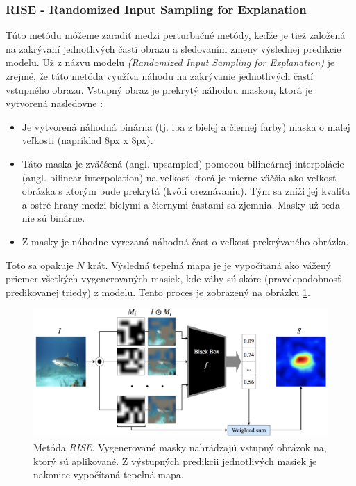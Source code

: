 
\subsubsection{RISE - Randomized Input Sampling for Explanation}

Túto metódu môžeme zaradiť medzi perturbačné metódy, keďže je tiež založená na zakrývaní jednotlivých častí obrazu a sledovaním zmeny výslednej predikcie modelu. Už z názvu modelu \textit{(Randomized Input Sampling for Explanation)} je zrejmé, že táto metóda využíva náhodu na zakrývanie jednotlivých častí vstupného obrazu. Vstupný obraz je prekrytý náhodou maskou, ktorá je vytvorená nasledovne \cite{petsiuk2018rise}:

\begin{itemize}
    \item Je vytvorená náhodná binárna (tj. iba z bielej a čiernej farby) maska o malej veľkosti (napríklad 8px x 8px).
    \item Táto maska je zväčšená (angl. upsampled) pomocou bilineárnej interpolácie \cite{petsiuk2018rise} (angl. bilinear interpolation) na veľkosť ktorá je mierne väčšia ako veľkosť obrázka s ktorým bude prekrytá (kvôli oreznávaniu). Tým sa zníži jej kvalita a ostré hrany medzi bielymi a čiernymi časťami sa zjemnia. Masky už teda nie sú binárne.
    \item Z masky je náhodne vyrezaná náhodná čast o veľkosť prekrývaného obrázka.
\end{itemize}


Toto sa opakuje $N$ krát. Výsledná tepelná mapa je je vypočítaná ako vážený priemer všetkých vygenerovaných masiek, kde váhy sú skóre (pravdepodobnosť predikovanej triedy) z modelu. Tento proces je zobrazený na obrázku \ref{fig:rise_architecture}.

\begin{figure}[h!]
\centering
\includegraphics[scale=0.35]{assets/images/rise_architecture.png}
\caption{Metóda \textit{RISE}. \cite{petsiuk2018rise} Vygenerované masky nahrádzajú vstupný obrázok na, ktorý sú aplikované. Z výstupných predikcii jednotlivých masiek je nakoniec vypočítaná tepelná mapa.}
\label{fig:rise_architecture}
\end{figure}

